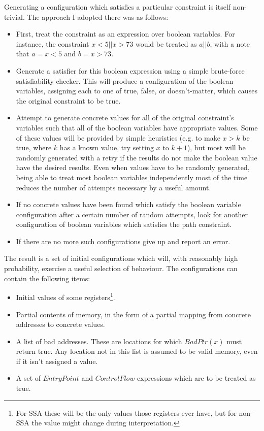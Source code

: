 Generating a configuration which satisfies a particular constraint is
itself non-trivial.  The approach I adopted there was as follows:

\begin{itemize}
\item First, treat the constraint as an expression over boolean
  variables.  For instance, the constraint $x < 5 || x > 73$ would be
  treated as $a || b$, with a note that $a = x < 5$ and $b = x > 73$.
\item Generate a satisfier for this boolean expression using a simple
  brute-force satisfiability checker.  This will produce a
  configuration of the boolean variables, assigning each to one of
  true, false, or doesn't-matter, which causes the original constraint
  to be true.
\item Attempt to generate concrete values for all of the original
  constraint's variables such that all of the boolean variables have
  appropriate values.  Some of these values will be provided by simple
  heuristics (e.g. to make $x > k$ be true, where $k$ has a known
  value, try setting $x$ to $k+1$), but most will be randomly
  generated with a retry if the results do not make the boolean value
  have the desired results.  Even when values have to be randomly
  generated, being able to treat most boolean variables independently
  most of the time reduces the number of attempts necessary by a
  useful amount.
\item If no concrete values have been found which satisfy the boolean
  variable configuration after a certain number of random attempts,
  look for another configuration of boolean variables which satisfies
  the path constraint.
\item If there are no more such configurations give up and report an
  error.
\end{itemize}

The result is a set of initial configurations which will, with
reasonably high probability, exercise a useful selection of
\StateMachine behaviour.  The configurations can contain the following
items:

\begin{itemize}
\item Initial values of some registers\footnote{For SSA \StateMachines
  these will be the only values those registers ever have, but for
  non-SSA \StateMachines the value might change during
  interpretation.}.
\item Partial contents of memory, in the form of a partial mapping
  from concrete addresses to concrete values.
\item A list of bad addresses.  These are locations for which
  $BadPtr(x)$ must return true.  Any location not in this list is
  assumed to be valid memory, even if it isn't assigned a value.
\item A set of $EntryPoint$ and $ControlFlow$ expressions which
  are to be treated as true.
\end{itemize}

